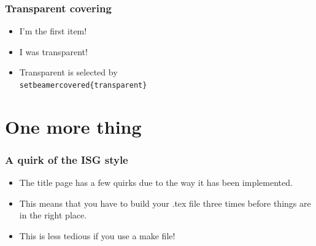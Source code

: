 \documentclass{beamer}
\begin{document}
\begin{frame}\frametitle{Transparent covering}
\begin{itemize}
	\item I'm the first item!
	\pause
	\item I was transparent!
	\pause
	\item Transparent is selected by \texttt{\\setbeamercovered\{transparent\}}
\end{itemize}
\end{frame}

\section{One more thing}
\begin{frame}\frametitle{A quirk of the ISG style}
\begin{itemize}
	\item The title page has a few quirks due to the way it has been implemented.
	\item This means that you have to build your .tex file three times before things are in the right place.
	\item This is less tedious if you use a make file!
\end{itemize}
\end{frame}
\end{document}
